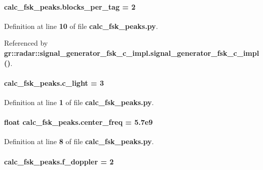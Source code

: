 \paragraph[{blocks\+\_\+per\+\_\+tag}]{ calc\+\_\+fsk\+\_\+peaks.\+blocks\+\_\+per\+\_\+tag = 2}\label{namespacecalc__fsk__peaks_a13d75b80953ffaa18409c19eba18646a}


Definition at line {\bf 10} of file {\bf calc\+\_\+fsk\+\_\+peaks.\+py}.



Referenced by {\bf gr\+::radar\+::signal\+\_\+generator\+\_\+fsk\+\_\+c\+\_\+impl.\+signal\+\_\+generator\+\_\+fsk\+\_\+c\+\_\+impl()}.

\paragraph[{c\+\_\+light}]{ calc\+\_\+fsk\+\_\+peaks.\+c\+\_\+light = 3}\label{namespacecalc__fsk__peaks_a975d4ba20338399ba38cfb07ebf7a260}


Definition at line {\bf 1} of file {\bf calc\+\_\+fsk\+\_\+peaks.\+py}.

\paragraph[{center\+\_\+freq}]{\setlength{\rightskip}{0pt plus 5cm}float calc\+\_\+fsk\+\_\+peaks.\+center\+\_\+freq = 5.\+7e9}\label{namespacecalc__fsk__peaks_a4ef2e47855d521cbe0ecbf1b33d475a5}


Definition at line {\bf 8} of file {\bf calc\+\_\+fsk\+\_\+peaks.\+py}.

\paragraph[{f\+\_\+doppler}]{ calc\+\_\+fsk\+\_\+peaks.\+f\+\_\+doppler = 2}\label{namespacecalc__fsk__peaks_a5985ace326d61309155d065d33044873}


